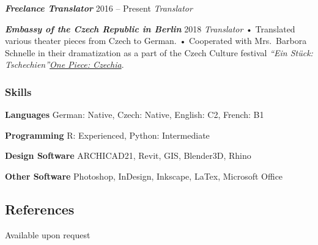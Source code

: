\documentclass[
  letterpaper,
  DIV=11,
  numbers=noendperiod]{scrartcl}
\begin{document}
\textbf{\emph{Freelance Translator}} {2016 -- Present} \emph{Translator}

\textbf{\emph{Embassy of the Czech Republic in Berlin}} {2018}
\emph{Translator} • Translated various theater pieces from Czech to
German. • Cooperated with Mrs.~Barbora Schnelle in their dramatization
as a part of the Czech Culture festival \emph{``Ein Stück:
Tschechien''\href{https://www.drama-panorama.com/en/event/ein-stuck-tschechien-new-czech-drama-2018/}{One
Piece: Czechia}}.

\hypertarget{skills}{%
\subsubsection{Skills}\label{skills}}

\textbf{Languages} German: Native, Czech: Native, English: C2, French:
B1

\textbf{Programming} R: Experienced, Python: Intermediate

\textbf{Design Software} ARCHICAD21, Revit, GIS, Blender3D, Rhino

\textbf{Other Software} Photoshop, InDesign, Inkscape, LaTex, Microsoft
Office

\hypertarget{references}{%
\subsection{References}\label{references}}

Available upon request
\end{document}
